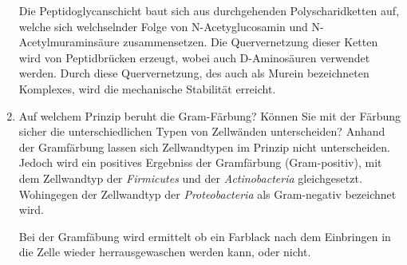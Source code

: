 \begin{enumerate}
		Die Peptidoglycanschicht baut sich aus durchgehenden Polyscharidketten auf,
		welche sich welchselnder Folge von N-Acetyglucosamin und N-Acetylmuraminsäure zusammensetzen.
		Die Quervernetzung dieser Ketten wird von Peptidbrücken erzeugt,
		wobei auch D-Aminosäuren verwendet werden.
		Durch diese Quervernetzung,
		des auch als Murein bezeichneten Komplexes,
		wird die mechanische Stabilität erreicht.


	\item Auf welchem Prinzip beruht die Gram-Färbung? Können Sie mit der Färbung sicher die unterschiedlichen Typen von Zellwänden unterscheiden?
		Anhand der Gramfärbung lassen sich Zellwandtypen im Prinzip nicht unterscheiden.
		Jedoch wird ein positives Ergebniss der Gramfärbung (Gram-positiv),
		mit dem Zellwandtyp der \emph{Firmicutes} und der \emph{Actinobacteria} gleichgesetzt.
		Wohingegen der Zellwandtyp der \emph{Proteobacteria} als Gram-negativ bezeichnet wird.

		Bei der Gramfäbung wird ermittelt ob ein Farblack nach dem Einbringen in die Zelle wieder herrausgewaschen werden kann,
		oder nicht.
\end{enumerate}

